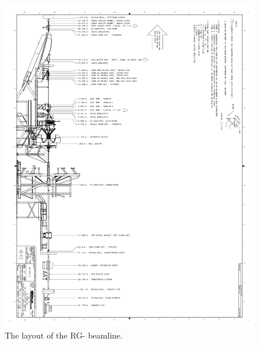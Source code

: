 \documentclass[12pt]{article}
\begin{document}
\begin{figure}[hbt]
\vspace{-2cm}
\begin{center}
\includegraphics[width=6in]{rgm_beam_page1.pdf}
\caption{ \label{fig:beamline1} The layout of the RG- beamline. }
\end{center}
\end{figure}
\end{document}
